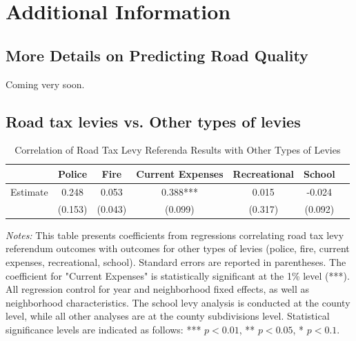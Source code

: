 \clearpage


\section{Additional Information} \label{sec:appxc}

\subsection{More Details on Predicting Road Quality} \label{sec:appxc1}

Coming very soon.

\subsection{Road tax levies vs. Other types of levies}

\begin{table}[ht!]
    \centering
    \caption{Correlation of Road Tax Levy Referenda Results with Other Types of Levies}
    \begin{tabular}{lcccccc}
    \toprule
    & Police & Fire & Current Expenses & Recreational & School \\
    \midrule
    Estimate & 0.248 & 0.053 & 0.388*** & 0.015 & -0.024 \\
    & (0.153) & (0.043) & (0.099) & (0.317) & (0.092) \\
    \bottomrule
    \end{tabular}
    \begin{minipage}{\textwidth}
    \footnotesize
    \textit{Notes:} This table presents coefficients from regressions correlating road tax levy referendum outcomes with outcomes for other types of levies (police, fire, current expenses, recreational, school). Standard errors are reported in parentheses. The coefficient for "Current Expenses" is statistically significant at the 1\% level (***). All regression control for year and neighborhood fixed effects, as well as neighborhood characteristics. The school levy analysis is conducted at the county level, while all other analyses are at the county subdivisions level. Statistical significance levels are indicated as follows: *** $p<0.01$, ** $p<0.05$, * $p<0.1$.
    \end{minipage}
\end{table}


